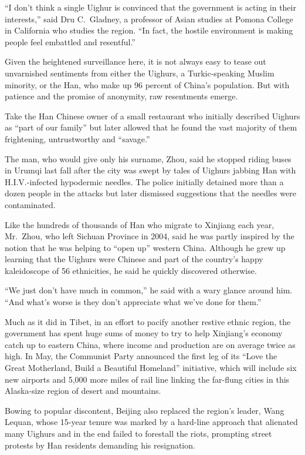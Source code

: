 ﻿\documentclass[12pt]{article}
\begin{document}
``I don't think a single Uighur is convinced that the government is acting in their interests,''
said Dru C.~Gladney, a professor of Asian studies at Pomona College in California who studies the
region. ``In fact, the hostile environment is making people feel embattled and resentful.''

Given the heightened surveillance here, it is not always easy to tease out unvarnished sentiments
from either the Uighurs, a Turkic-speaking Muslim minority, or the Han, who make up 96 percent of
China's population. But with patience and the promise of anonymity, raw resentments emerge.

Take the Han Chinese owner of a small restaurant who initially described Uighurs as ``part of our
family'' but later allowed that he found the vast majority of them frightening, untrustworthy and
``savage.''

The man, who would give only his surname, Zhou, said he stopped riding buses in Urumqi last fall
after the city was swept by tales of Uighurs jabbing Han with H.I.V.-infected hypodermic needles.
The police initially detained more than a dozen people in the attacks but later dismissed
suggestions that the needles were contaminated.

Like the hundreds of thousands of Han who migrate to Xinjiang each year, Mr.~Zhou, who left Sichuan
Province in 2004, said he was partly inspired by the notion that he was helping to ``open up''
western China. Although he grew up learning that the Uighurs were Chinese and part of the country's
happy kaleidoscope of 56 ethnicities, he said he quickly discovered otherwise.

``We just don't have much in common,'' he said with a wary glance around him. ``And what's worse is
they don't appreciate what we've done for them.''

Much as it did in Tibet, in an effort to pacify another restive ethnic region, the government has
spent huge sums of money to try to help Xinjiang's economy catch up to eastern China, where income
and production are on average twice as high. In May, the Communist Party announced the first leg of
its ``Love the Great Motherland, Build a Beautiful Homeland'' initiative, which will include six new
airports and 5,000 more miles of rail line linking the far-flung cities in this Alaska-size region
of desert and mountains.

Bowing to popular discontent, Beijing also replaced the region's leader, Wang Lequan, whose 15-year
tenure was marked by a hard-line approach that alienated many Uighurs and in the end failed to
forestall the riots, prompting street protests by Han residents demanding his resignation.
\end{document}
